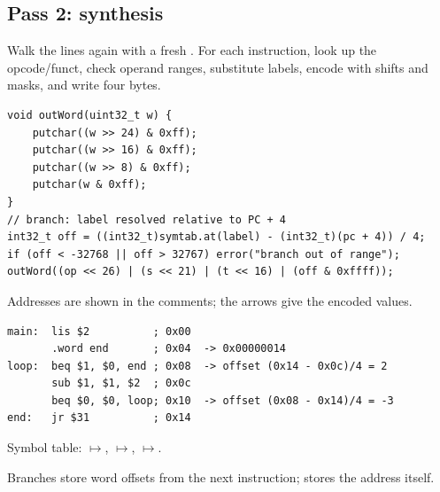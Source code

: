 \subsection{Pass 2: synthesis}
Walk the lines again with a fresh . For each instruction, look up the opcode/funct,
check operand ranges, substitute labels, encode with shifts and masks, and write four bytes.

\begin{lstlisting}[style=cpp]
void outWord(uint32_t w) {
    putchar((w >> 24) & 0xff);
    putchar((w >> 16) & 0xff);
    putchar((w >> 8) & 0xff);
    putchar(w & 0xff);
}
// branch: label resolved relative to PC + 4
int32_t off = ((int32_t)symtab.at(label) - (int32_t)(pc + 4)) / 4;
if (off < -32768 || off > 32767) error("branch out of range");
outWord((op << 26) | (s << 21) | (t << 16) | (off & 0xffff));
\end{lstlisting}

\begin{example}
Addresses are shown in the comments; the arrows give the encoded values.
\begin{lstlisting}[style=mips]
main:  lis $2          ; 0x00
       .word end       ; 0x04  -> 0x00000014
loop:  beq $1, $0, end ; 0x08  -> offset (0x14 - 0x0c)/4 = 2
       sub $1, $1, $2  ; 0x0c
       beq $0, $0, loop; 0x10  -> offset (0x08 - 0x14)/4 = -3
end:   jr $31          ; 0x14
\end{lstlisting}
Symbol table: $\mapsto$, $\mapsto$,
$\mapsto$.
\begin{center}

\small Branches store word offsets from the next instruction;  stores the address itself.
\end{center}
\end{example}

